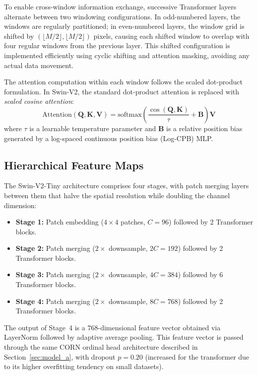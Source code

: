 To enable cross-window information exchange, successive Transformer layers alternate between two windowing configurations. In odd-numbered layers, the windows are regularly partitioned; in even-numbered layers, the window grid is shifted by $(\lfloor M/2 \rfloor, \lfloor M/2 \rfloor)$ pixels, causing each shifted window to overlap with four regular windows from the previous layer. This shifted configuration is implemented efficiently using cyclic shifting and attention masking, avoiding any actual data movement.

The attention computation within each window follows the scaled dot-product formulation. In Swin-V2, the standard dot-product attention is replaced with \emph{scaled cosine attention}:
\begin{equation}
    \text{Attention}(\mathbf{Q}, \mathbf{K}, \mathbf{V}) = \text{softmax}\left(\frac{\cos(\mathbf{Q}, \mathbf{K})}{\tau} + \mathbf{B}\right)\mathbf{V}
    \label{eq:cosine_attention}
\end{equation}
where $\tau$ is a learnable temperature parameter and $\mathbf{B}$ is a relative position bias generated by a log-spaced continuous position bias (Log-CPB) MLP.

\subsection{Hierarchical Feature Maps}

The Swin-V2-Tiny architecture comprises four stages, with patch merging layers between them that halve the spatial resolution while doubling the channel dimension:

\begin{itemize}
    \item \textbf{Stage 1:} Patch embedding ($4 \times 4$ patches, $C = 96$) followed by 2 Transformer blocks.
    \item \textbf{Stage 2:} Patch merging ($2\times$ downsample, $2C = 192$) followed by 2 Transformer blocks.
    \item \textbf{Stage 3:} Patch merging ($2\times$ downsample, $4C = 384$) followed by 6 Transformer blocks.
    \item \textbf{Stage 4:} Patch merging ($2\times$ downsample, $8C = 768$) followed by 2 Transformer blocks.
\end{itemize}

The output of Stage~4 is a $768$-dimensional feature vector obtained via LayerNorm followed by adaptive average pooling. This feature vector is passed through the same CORN ordinal head architecture described in Section~\ref{sec:model_a}, with dropout $p = 0.20$ (increased for the transformer due to its higher overfitting tendency on small datasets).


